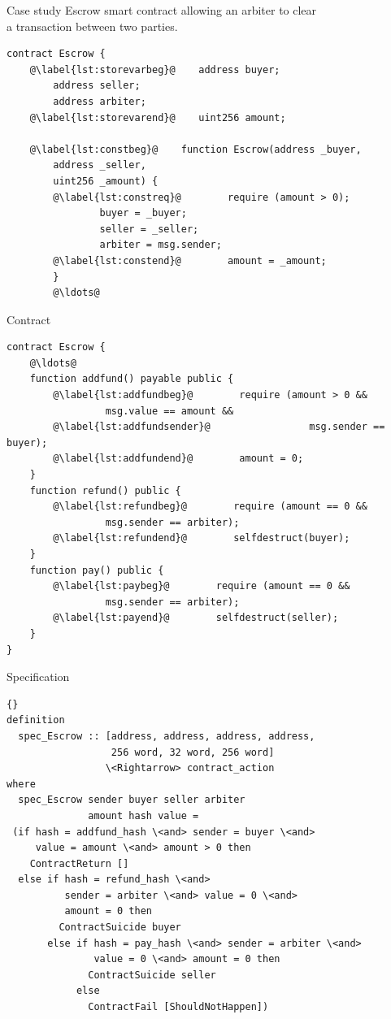 \documentclass{beamer}
\begin{document}
\begin{frame}[fragile]{Case study}
Escrow smart contract allowing an arbiter to clear\\
a transaction between two parties.\\
		\begin{lstlisting}[language=Solidity]
contract Escrow {
	@\label{lst:storevarbeg}@    address buyer;
	    address seller;
	    address arbiter;
	@\label{lst:storevarend}@    uint256 amount;
	
	@\label{lst:constbeg}@    function Escrow(address _buyer,
	    address _seller,
	    uint256 _amount) {
		@\label{lst:constreq}@        require (amount > 0);
		        buyer = _buyer;
		        seller = _seller;
		        arbiter = msg.sender;
		@\label{lst:constend}@        amount = _amount;
	    }
	    @\ldots@
	\end{lstlisting}
\end{frame}

\begin{frame}[fragile]{Contract}
		\begin{lstlisting}[language=Solidity]
contract Escrow {
    @\ldots@
    function addfund() payable public {
		@\label{lst:addfundbeg}@        require (amount > 0 &&
                 msg.value == amount &&
		@\label{lst:addfundsender}@                 msg.sender == buyer);
		@\label{lst:addfundend}@        amount = 0;
    }
    function refund() public {
		@\label{lst:refundbeg}@        require (amount == 0 &&
                 msg.sender == arbiter);
		@\label{lst:refundend}@        selfdestruct(buyer);
    }
    function pay() public {
		@\label{lst:paybeg}@        require (amount == 0 &&
                 msg.sender == arbiter);
		@\label{lst:payend}@        selfdestruct(seller);
    }
}
		\end{lstlisting}
\end{frame}

\begin{frame}[fragile]{Specification}
\begin{lstlisting}[language=Isar,keywords={[3]{addfund\_hash,pay\_hash,refund\_hash,}}]{} 
definition 
  spec_Escrow :: [address, address, address, address, 
                  256 word, 32 word, 256 word]
                 \<Rightarrow> contract_action
where
  spec_Escrow sender buyer seller arbiter 
              amount hash value =
 (if hash = addfund_hash \<and> sender = buyer \<and>
     value = amount \<and> amount > 0 then
    ContractReturn []
  else if hash = refund_hash \<and>
          sender = arbiter \<and> value = 0 \<and>
          amount = 0 then
         ContractSuicide buyer
       else if hash = pay_hash \<and> sender = arbiter \<and>
               value = 0 \<and> amount = 0 then
              ContractSuicide seller
            else
              ContractFail [ShouldNotHappen])
		\end{lstlisting}
\end{frame}
	
\end{document}
